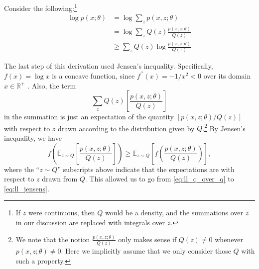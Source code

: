 Consider the following:\footnote{
If $z$ were continuous, then $Q$ would be a density, and the summations over $z$ in our
discussion are replaced with integrals over $z$.
}
\begin{align}
    \log p(x;\theta) &= \log \sum_{z} p(x,z;\theta)\\
        &= \log \sum_{z} Q(z) \frac{p(x,z;\theta)}{Q(z)}\label{eq:ll_q_over_q}\\
        &\ge \sum_{z} Q(z)\log\frac{p(x,z;\theta)}{Q(z)}\label{eq:ll_jensens}
\end{align}

The last step of this derivation used Jensen's inequality. Specifically,
$f(x) = \log x$ is a concave function, since $f^{\prime\prime}(x) = -1/x^2 < 0$ over its domain
$x \in \mathbb R^+$ . Also, the term
\begin{equation*}
    \sum_{z} Q(z)\left[ \frac{p(x,z;\theta)}{Q(z)} \right]
\end{equation*}
in the summation is just an expectation of the quantity $[p(x,z;\theta)/Q(z)]$ with
respect to $z$ drawn according to the distribution given by $Q$.\footnote{
We note that the notion $\frac{p(x,z;\theta)}{Q(z)}$
only makes sense if $Q(z) \ne 0$ whenever $p(x,z;\theta) \ne 0$.
Here we implicitly assume that we only consider those $Q$ with such a property.    
} By Jensen's inequality, we have
\begin{equation*}
    f \left(\mathbb E_{z \sim Q}\left[ \frac{p(x,z;\theta)}{Q(z)}\right]\right) \ge \mathbb E_{z \sim Q} \left[f\left( \frac{p(x,z;\theta)}{Q(z)}\right)\right],
\end{equation*}
where the ``$z \sim Q$'' subscripts above indicate that the expectations are with
respect to $z$ drawn from $Q$. This allowed us to go from \cref{eq:ll_q_over_q} to
\cref{eq:ll_jensens}.

